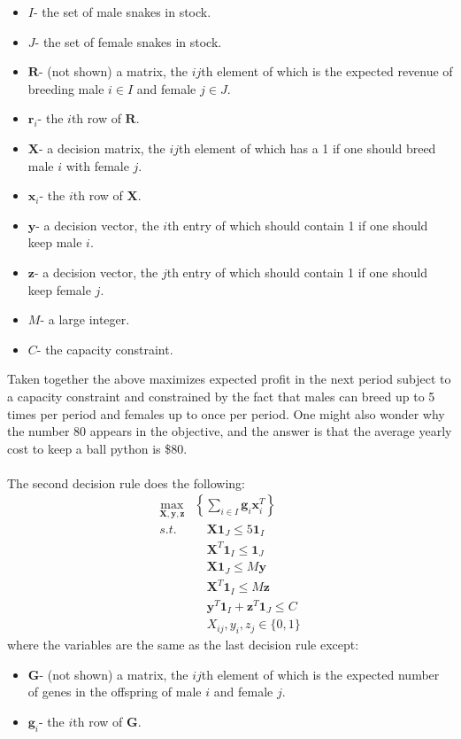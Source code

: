 \documentclass{article}
\begin{document}
	\begin{itemize}
	\item $I$- the set of male snakes in stock.
	\item $J$- the set of female snakes in stock.
	\item $\mathbf R$- (not shown) a matrix, the $ij$th element of which is the expected revenue of breeding male $i\in I$ and female $j\in J$.
	\item $\mathbf r_i$- the $i$th row of $\mathbf R$.
	\item $\mathbf X$- a decision matrix, the $ij$th element of which has a 1 if one should breed male $i$ with female $j$.
	\item $\mathbf x_i$- the $i$th row of $\mathbf X$.
	\item $\mathbf y$- a decision vector, the $i$th entry of which should contain 1 if one should keep male $i$.
	\item $\mathbf z$- a decision vector, the $j$th entry of which should contain 1 if one should keep female $j$.
	\item $M$- a large integer.
	\item $C$- the capacity constraint.
	\end{itemize}
	\indent Taken together the above maximizes expected profit in the next period subject to a capacity constraint and constrained by the fact that males can breed up to 5 times per period and females up to once per period. One might also wonder why the number 80 appears in the objective, and the answer is that the average yearly cost to keep a ball python is \$80.\\
	\\\indent The second decision rule does the following:
	\begin{align*}
		\max_{\mathbf{X},\mathbf{y},\mathbf{z}}&\left\{ \sum_{i\in I}\mathbf g_i \mathbf x_i^T\right\}\\
      s.t. & \quad\mathbf X\mathbf 1_J \leq 5\mathbf 1_I \\
      &\quad \mathbf X^T \mathbf 1_I \leq \mathbf1_J\\
      &\quad \mathbf X \mathbf1_J\leq M\mathbf y\\
      & \quad\mathbf X^T\mathbf 1_I \leq M\mathbf z\\
      &\quad \mathbf y^T\mathbf 1_I + \mathbf z^T\mathbf 1_J \leq C\\
      & \quad X_{ij}, y_i, z_j \in \{0,1\}
	\end{align*}
	where the variables are the same as the last decision rule except:
	\begin{itemize}
	\item $\mathbf G$- (not shown) a matrix, the $ij$th element of which is the expected number of genes in the offspring of male $i$ and female $j$.
	\item $\mathbf g_i$- the $i$th row of $\mathbf G$.
	\end{itemize}
\end{document}
